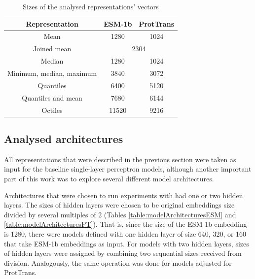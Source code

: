 \documentclass[12pt]{article}
\begin{document}
    \newpage

	\begin{table}[h!]
		\caption{Sizes of the analysed representations' vectors}
		\vspace{0.2cm}
		\centering
		\begin{tabular}{ | c | c c | }
			\hline 
			Representation & ESM-1b & ProtTrans \\
			\hline 
			Mean & 1280 & 1024 \\
			Joined mean & \multicolumn{2}{c|}{2304} \\
			Median & 1280 & 1024 \\
			Minimum, median, maximum & 3840 & 3072 \\
			Quantiles & 6400 & 5120 \\
			Quantiles and mean & 7680 & 6144 \\
			Octiles & 11520 & 9216 \\
			\hline    
		\end{tabular}
		\label{table:vectorsDimensions}
	\end{table}

	\newpage

	\subsection{Analysed architectures}

	All representations that were described
	in the previous section were taken as input for the baseline
	single-layer perceptron models, although another important part 
	of this work was to explore several different 
	model architectures. 

	Architectures that were chosen to run experiments with 
	had one or two hidden layers. The sizes of hidden layers 
	were chosen to be original embeddings size divided 
	by several multiples of 2 (Tables \ref{table:modelArchitecturesESM} 
	and \ref{table:modelArchitecturesPT}). That is, since the 
	size of the ESM-1b embedding is 1280, there were 
	models defined with one hidden layer of size 640, 320, or 160 
	that take ESM-1b embeddings as input. For models with two 
	hidden layers, sizes of hidden layers were assigned by 
	combining two sequential sizes received from division. 
	Analogously, the same operation was done for models adjusted 
	for ProtTrans.
\end{document}
